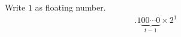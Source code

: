 \documentclass[11pt,a4paper]{article}
\begin{document}
\begin{titlepage}
    \maketitle
\end{titlepage}
\begin{center} 
    \tableofcontents  
%
\end{center}
\newpage
\setcounter{section}{2}
\section{}
\subsection{}
Write $1$ as floating number. 
\begin{align}
    .1\underbrace{00\cdots0}_{t-1} \times 2^1
\end{align}
\end{document}

